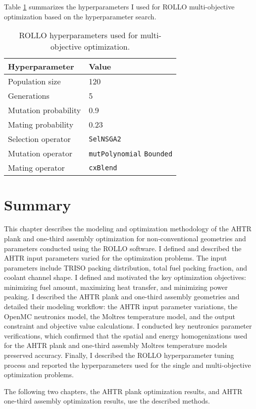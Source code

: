 Table \ref{tab:multi-obj-hyp} summarizes the hyperparameters I used for \gls{ROLLO} 
multi-objective optimization based on the hyperparameter search. 
\begin{table}[htbp]
    \centering
    \onehalfspacing
    \caption{\acrfull{ROLLO} hyperparameters used for multi-objective optimization.}
	\label{tab:multi-obj-hyp}
    \footnotesize
    \begin{tabular}{ll}
    \hline 
    \textbf{Hyperparameter} & \textbf{Value} \\
    \hline 
    Population size & 120 \\
    Generations & 5 \\
    Mutation probability & 0.9 \\
    Mating probability & 0.23 \\
    Selection operator & \texttt{SelNSGA2} \\
    Mutation operator & \texttt{mutPolynomial} \texttt{Bounded} \\
    Mating operator & \texttt{cxBlend} \\
    \hline
    \end{tabular}
\end{table}

\pagebreak
\section{Summary}
\glsresetall
This chapter describes the modeling and optimization methodology of the 
\gls{AHTR} plank and one-third assembly optimization for non-conventional 
geometries and parameters conducted using the \gls{ROLLO} software.
I defined and described the \gls{AHTR} input parameters varied for the optimization 
problems. 
The input parameters include \gls{TRISO} packing distribution, total fuel packing 
fraction, and coolant channel shape. 
I defined and motivated the key optimization objectives: minimizing fuel amount,
maximizing heat transfer, and minimizing power peaking.
I described the \gls{AHTR} plank and one-third assembly geometries and  
detailed their modeling workflow: the \gls{AHTR} input parameter variations, 
the OpenMC neutronics model, the Moltres temperature model, and 
the output constraint and objective value calculations. 
I conducted key neutronics parameter verifications, which confirmed that the spatial 
and energy homogenizations used for the \gls{AHTR} plank and one-third assembly Moltres 
temperature models preserved accuracy.
Finally, I described the \gls{ROLLO} hyperparameter tuning process and reported the 
hyperparameters used for the single and multi-objective optimization problems. 

The following two chapters, the \gls{AHTR} plank optimization results, and \gls{AHTR} 
one-third assembly optimization results, use the described methods.